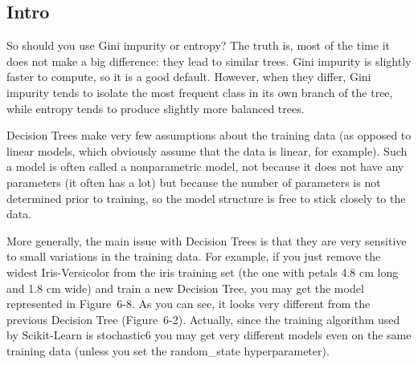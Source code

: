 \documentclass[]{book}
\theoremstyle{definition}
\theoremstyle{definition}
\theoremstyle{definition}
\theoremstyle{remark}
\begin{document}
\subsection{Intro}\label{intro-10}

So should you use Gini impurity or entropy? The truth is, most of the
time it does not make a big difference: they lead to similar trees. Gini
impurity is slightly faster to compute, so it is a good default.
However, when they differ, Gini impurity tends to isolate the most
frequent class in its own branch of the tree, while entropy tends to
produce slightly more balanced trees.

Decision Trees make very few assumptions about the training data (as
opposed to linear models, which obviously assume that the data is
linear, for example). Such a model is often called a nonparametric
model, not because it does not have any parameters (it often has a lot)
but because the number of parameters is not determined prior to
training, so the model structure is free to stick closely to the data.

More generally, the main issue with Decision Trees is that they are very
sensitive to small variations in the training data. For example, if you
just remove the widest Iris-Versicolor from the iris training set (the
one with petals 4.8 cm long and 1.8 cm wide) and train a new Decision
Tree, you may get the model represented in Figure~6-8. As you can see,
it looks very different from the previous Decision Tree (Figure~6-2).
Actually, since the training algorithm used by Scikit-Learn is
stochastic6 you may get very different models even on the same training
data (unless you set the random\_state hyperparameter).
\end{document}
